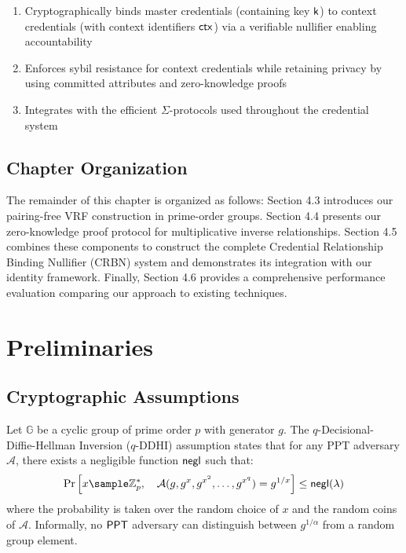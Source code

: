 \begin{enumerate}
    \item Cryptographically binds master credentials (containing key $\mathsf{k}$) to context credentials (with context identifiers $\mathsf{ctx}$) via a verifiable nullifier enabling accountability
    
    \item Enforces sybil resistance for context credentials while retaining privacy by using committed attributes and zero-knowledge proofs
    
    \item Integrates with the efficient $\Sigma$-protocols used throughout the credential system
\end{enumerate}

\subsection*{Chapter Organization}
The remainder of this chapter is organized as follows: Section 4.3 introduces our pairing-free VRF construction in prime-order groups. Section 4.4 presents our zero-knowledge proof protocol for multiplicative inverse relationships. Section 4.5 combines these components to construct the complete Credential Relationship Binding Nullifier (CRBN) system and demonstrates its integration with our identity framework. Finally, Section 4.6 provides a comprehensive performance evaluation comparing our approach to existing techniques.













\section{Preliminaries}
\subsection{Cryptographic Assumptions}

\begin{definition}
Let $\mathbb{G}$ be a cyclic group of prime order $p$ with generator $g$. The $q$-Decisional-Diffie-Hellman Inversion ($q$-DDHI) assumption\cite{mitsunari_new_2002} states that for any PPT adversary $\mathcal{A}$, there exists a negligible function $\mathsf{negl}$ such that:
\[
\Pr\left[ x \sample \Zp^*, \quad \mathcal{A}(g, g^x, g^{x^2}, \ldots, g^{x^q}) = g^{1/x} \right] \leq \negl(\lambda)
\]
where the probability is taken over the random choice of $x$ and the random coins of $\mathcal{A}$. Informally, no $\mathsf{PPT}$ adversary can distinguish between $g^{1/\alpha}$ from a random group element.
\end{definition}

